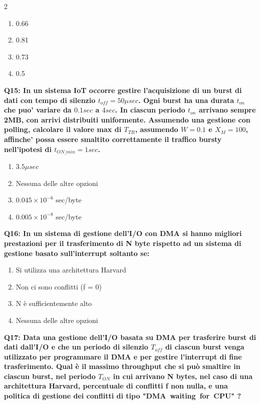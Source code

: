 \documentclass[10pt]{article}
\begin{document}
\begin{multicols}{2}
\begin{enumerate}[label=\arabic*.]
\item 0.66
\item 0.81
\item 0.73
\item 0.5
\end{enumerate}
\textbf{Q15: In un sistema IoT occorre gestire l'acquisizione di un burst di dati con tempo di silenzio $t_{off}=50 \mu sec$. Ogni burst ha una durata $t_{on}$ che puo' variare da $0.1 sec$ a $4 sec$. In ciascun periodo $t_{on}$ arrivano sempre 2MB, con arrivi distribuiti uniformente. Assumendo una gestione con polling, calcolare il valore max di $T_{TR}$, assumendo $W=0.1$ e $X_M = 100$, affinche' possa essere smaltito correttamente il traffico bursty nell'ipotesi di $t_{ON\_min}=1 sec$.}

\begin{enumerate}[label=\arabic*.]
\item $3.5 \mu sec$
\item Nessuna delle altre opzioni
\item $0.045\times10^{-6}$ sec/byte
\item $0.005\times10^{-8}$ sec/byte
\end{enumerate}
\textbf{Q16: In un sistema di gestione dell’I/O con DMA si hanno migliori prestazioni per il trasferimento di N byte rispetto ad un sistema di gestione basato sull’interrupt soltanto se:}

\begin{enumerate}[label=\arabic*.]
\item Si utilizza una architettura Harvard
\item Non ci sono conflitti (f = 0)
\item N è sufficientemente alto
\item Nessuna delle altre opzioni
\end{enumerate}
\textbf{Q17: Data una gestione dell’I/O basata su DMA per trasferire burst di dati dall’I/O e che un periodo di silenzio $T_{off}$ di ciascun burst venga utilizzato per programmare il DMA e per gestire l’interrupt di fine trasferimento. Qual è il massimo throughput che si può smaltire in ciascun burst, nel periodo $T_{ON}$ in cui arrivano N bytes, nel caso di una architettura Harvard, percentuale di conflitti f non nulla, e una politica di gestione dei conflitti di tipo "DMA waiting for CPU" ?}


\end{multicols}
\end{document}
